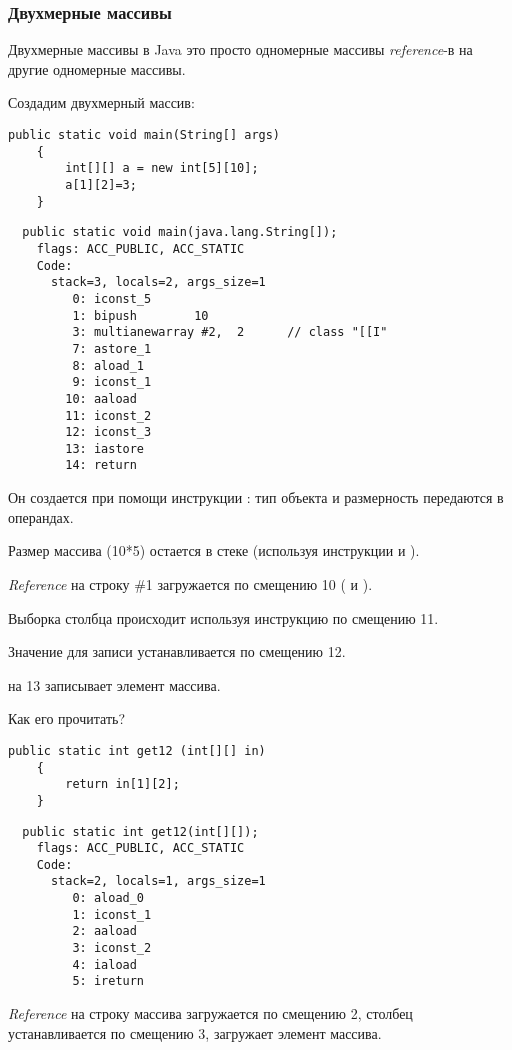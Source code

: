 \subsubsection{Двухмерные массивы}


Двухмерные массивы в Java это просто одномерные массивы \emph{reference}-в на другие одномерные 
массивы.

Создадим двухмерный массив:

\begin{lstlisting}[style=customjava]
	public static void main(String[] args)
	{
		int[][] a = new int[5][10];
		a[1][2]=3;
	}
\end{lstlisting}

\begin{lstlisting}
  public static void main(java.lang.String[]);
    flags: ACC_PUBLIC, ACC_STATIC
    Code:
      stack=3, locals=2, args_size=1
         0: iconst_5      
         1: bipush        10
         3: multianewarray #2,  2      // class "[[I"
         7: astore_1      
         8: aload_1       
         9: iconst_1      
        10: aaload        
        11: iconst_2      
        12: iconst_3      
        13: iastore       
        14: return        
\end{lstlisting}


Он создается при помощи инструкции : тип объекта и размерность передаются
в операндах.

Размер массива (10*5) остается в стеке (используя инструкции  и ).


\emph{Reference} на строку \#1 загружается по смещению 10 ( и ).

Выборка столбца происходит используя инструкцию  по смещению 11.

Значение для записи устанавливается по смещению 12.

 на 13 записывает элемент массива.

Как его прочитать?

\begin{lstlisting}[style=customjava]
	public static int get12 (int[][] in)
	{
		return in[1][2];
	}
\end{lstlisting}

\begin{lstlisting}
  public static int get12(int[][]);
    flags: ACC_PUBLIC, ACC_STATIC
    Code:
      stack=2, locals=1, args_size=1
         0: aload_0       
         1: iconst_1      
         2: aaload        
         3: iconst_2      
         4: iaload        
         5: ireturn       
\end{lstlisting}


\emph{Reference} на строку массива загружается по смещению 2, 
столбец устанавливается по смещению 3,  загружает элемент массива.
